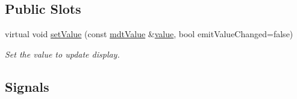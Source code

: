 \subsection*{Public Slots}
\begin{DoxyCompactItemize}
\item 
virtual void \hyperlink{classmdt_abstract_io_a3f5fc9ed13c2ec2aad0987cd15d95e31}{set\-Value} (const \hyperlink{classmdt_value}{mdt\-Value} \&\hyperlink{classmdt_abstract_io_a839b0d3a4a1d4616e5b20d744c5f75a1}{value}, bool emit\-Value\-Changed=false)
\begin{DoxyCompactList}\small\item\em Set the value to update display. \end{DoxyCompactList}\end{DoxyCompactItemize}
\subsection*{Signals}
